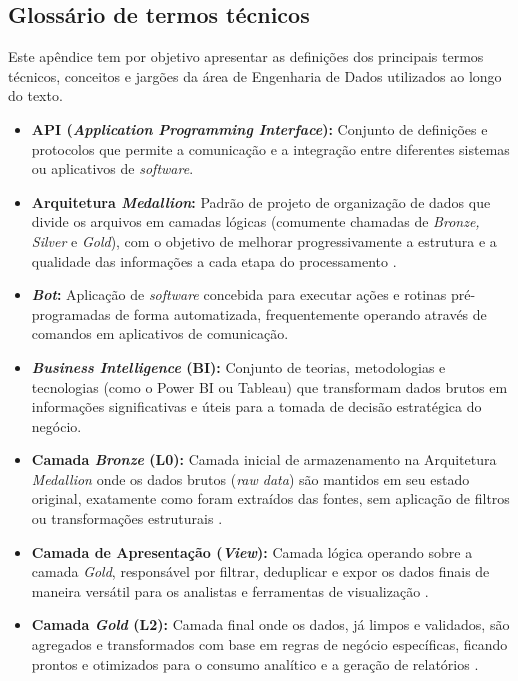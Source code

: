 \documentclass[
	12pt,				%
	openright,			%
	oneside,			%
	a4paper,			%
	english,			%
	brazil				%
	]{abntex2}
\begin{document}
\begin{apendicesenv}
\chapter{Glossário de termos técnicos}
Este apêndice tem por objetivo apresentar as definições dos principais termos técnicos, conceitos e jargões da área de Engenharia de Dados utilizados ao longo do texto.

\begin{itemize}
    \item \textbf{API (\textit{Application Programming Interface}):} Conjunto de definições e protocolos que permite a comunicação e a integração entre diferentes sistemas ou aplicativos de \textit{software}.
    \item \textbf{Arquitetura \textit{Medallion}:} Padrão de projeto de organização de dados que divide os arquivos em camadas lógicas (comumente chamadas de \textit{Bronze, Silver} e \textit{Gold}), com o objetivo de melhorar progressivamente a estrutura e a qualidade das informações a cada etapa do processamento \cite{gujjala_medallion}.
    \item \textbf{\textit{Bot}:} Aplicação de \textit{software} concebida para executar ações e rotinas pré-programadas de forma automatizada, frequentemente operando através de comandos em aplicativos de comunicação.
    \item \textbf{\textit{Business Intelligence} (BI):} Conjunto de teorias, metodologias e tecnologias (como o Power BI ou Tableau) que transformam dados brutos em informações significativas e úteis para a tomada de decisão estratégica do negócio.
    \item \textbf{Camada \textit{Bronze} (L0):} Camada inicial de armazenamento na Arquitetura \textit{Medallion} onde os dados brutos (\textit{raw data}) são mantidos em seu estado original, exatamente como foram extraídos das fontes, sem aplicação de filtros ou transformações estruturais \cite{gujjala_medallion}.
    \item \textbf{Camada de Apresentação (\textit{View}):} Camada lógica operando sobre a camada \textit{Gold}, responsável por filtrar, deduplicar e expor os dados finais de maneira versátil para os analistas e ferramentas de visualização \cite{reis22}.
    \item \textbf{Camada \textit{Gold} (L2):} Camada final onde os dados, já limpos e validados, são agregados e transformados com base em regras de negócio específicas, ficando prontos e otimizados para o consumo analítico e a geração de relatórios \cite{gujjala_medallion}.

\end{itemize}
\end{apendicesenv}
\end{document}
